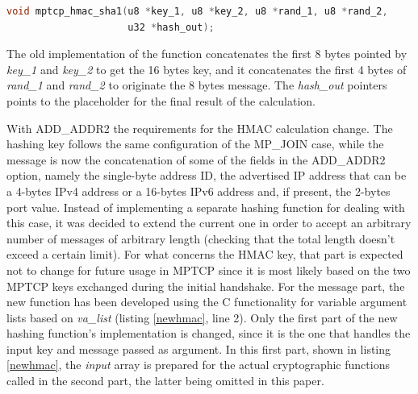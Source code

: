 \begin{lstlisting}[language=c, caption=Prototype for the old \textit{mptcp\_hmac\_sha1() function}, label=oldhmac]
void mptcp_hmac_sha1(u8 *key_1, u8 *key_2, u8 *rand_1, u8 *rand_2,
                     u32 *hash_out);
\end{lstlisting}

The old implementation of the function concatenates the first 8 bytes pointed by \textit{key\_1} and \textit{key\_2} to get the 16 bytes key, and it concatenates the first 4 bytes of \textit{rand\_1} and \textit{rand\_2} to originate the 8 bytes message. The \textit{hash\_out} pointers points to the placeholder for the final result of the calculation.


With ADD\_ADDR2 the requirements for the HMAC calculation change. The hashing key follows the same configuration of the MP\_JOIN case, while the message is now the concatenation of some of the fields in the ADD\_ADDR2 option, namely the single-byte address ID, the advertised IP address that can be a 4-bytes IPv4 address or a 16-bytes IPv6 address and, if present, the 2-bytes port value. Instead of implementing a separate hashing function for dealing with this case,  it was decided to extend the current one in order to accept an arbitrary number of messages of arbitrary length (checking that the total length doesn't exceed a certain limit). For what concerns the HMAC key, that part is expected not to change for future usage in MPTCP since it is most likely based on the two MPTCP keys exchanged during the initial handshake. For the message part, the new function has been developed using the C functionality for variable argument lists based on \textit{va\_list} (listing \ref{newhmac}, line 2). Only the first part of the new hashing function's implementation is changed, since it is the one that handles the input key and message passed as argument. In this first part, shown in listing \ref{newhmac}, the \textit{input} array is prepared for the actual cryptographic functions called in the second part, the latter being omitted in this paper.

